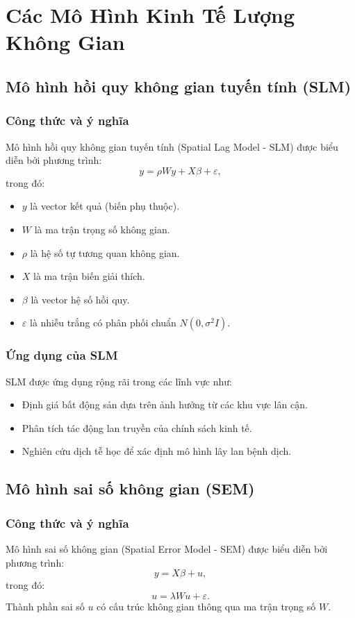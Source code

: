 \chapter{Các Mô Hình Kinh Tế Lượng Không Gian}
\section{Mô hình hồi quy không gian tuyến tính (SLM)}
\subsection{Công thức và ý nghĩa}
Mô hình hồi quy không gian tuyến tính (Spatial Lag Model - SLM) được biểu diễn bởi phương trình:
\begin{equation}
    y = \rho W y + X \beta + \varepsilon,
\end{equation}
trong đó:
\begin{itemize}
    \item $y$ là vector kết quả (biến phụ thuộc).
    \item $W$ là ma trận trọng số không gian.
    \item $\rho$ là hệ số tự tương quan không gian.
    \item $X$ là ma trận biến giải thích.
    \item $\beta$ là vector hệ số hồi quy.
    \item $\varepsilon$ là nhiễu trắng có phân phối chuẩn $N(0, \sigma^2 I)$.
\end{itemize}

\subsection{Ứng dụng của SLM}
SLM được ứng dụng rộng rãi trong các lĩnh vực như:
\begin{itemize}
    \item Định giá bất động sản dựa trên ảnh hưởng từ các khu vực lân cận.
    \item Phân tích tác động lan truyền của chính sách kinh tế.
    \item Nghiên cứu dịch tễ học để xác định mô hình lây lan bệnh dịch.
\end{itemize}

\section{Mô hình sai số không gian (SEM)}
\subsection{Công thức và ý nghĩa}
Mô hình sai số không gian (Spatial Error Model - SEM) được biểu diễn bởi phương trình:
\begin{equation}
    y = X \beta + u,
\end{equation}
trong đó:
\begin{equation}
    u = \lambda W u + \varepsilon.
\end{equation}
Thành phần sai số $u$ có cấu trúc không gian thông qua ma trận trọng số $W$.

